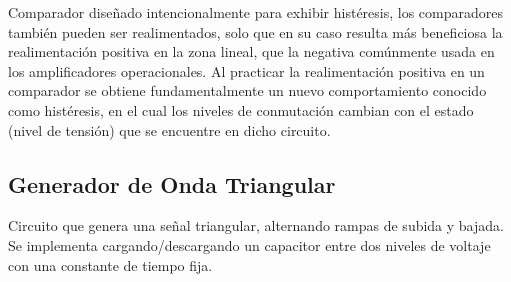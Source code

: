                 Comparador diseñado intencionalmente para exhibir histéresis, los comparadores
                también pueden ser realimentados, solo que en su caso resulta más beneficiosa la
                realimentación positiva en la zona lineal, que la negativa comúnmente usada en los
                amplificadores operacionales. Al practicar la realimentación positiva en un comparador
                se obtiene fundamentalmente un nuevo comportamiento conocido como histéresis, en el
                cual los niveles de conmutación cambian con el estado (nivel de tensión) que se encuentre
                en dicho circuito.
                
                \subsection*{Generador de Onda Triangular}
                
                Circuito que genera una señal triangular, alternando rampas de subida y bajada. Se
                implementa cargando/descargando un capacitor entre dos niveles de voltaje con una
                constante de tiempo fija.




               

\newpage
